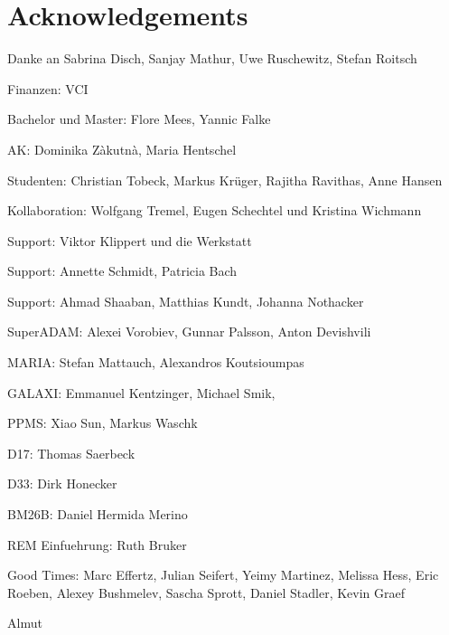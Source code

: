 \documentclass[\main/dresen_thesis.tex]{subfiles}
\begin{document}
	\section*{Acknowledgements}
	Danke an Sabrina Disch, Sanjay Mathur, Uwe Ruschewitz, Stefan Roitsch

	Finanzen: VCI

	Bachelor und Master: Flore Mees, Yannic Falke

	AK: Dominika Zàkutnà, Maria Hentschel

	Studenten: Christian Tobeck, Markus Kr\"uger, Rajitha Ravithas, Anne Hansen

	Kollaboration: Wolfgang Tremel, Eugen Schechtel und Kristina Wichmann

	Support: Viktor Klippert und die Werkstatt

	Support: Annette Schmidt, Patricia Bach

	Support: Ahmad Shaaban, Matthias Kundt, Johanna Nothacker

	SuperADAM: Alexei Vorobiev, Gunnar Palsson, Anton Devishvili

	MARIA: Stefan Mattauch, Alexandros Koutsioumpas

	GALAXI: Emmanuel Kentzinger, Michael Smik,

	PPMS: Xiao Sun, Markus Waschk

	D17: Thomas Saerbeck

	D33: Dirk Honecker

	BM26B: Daniel Hermida Merino

	REM Einfuehrung: Ruth Bruker

	Good Times: Marc Effertz, Julian Seifert, Yeimy Martinez, Melissa Hess, Eric Roeben, Alexey Bushmelev, Sascha Sprott, Daniel Stadler, Kevin Graef

	Almut
\end{document}
